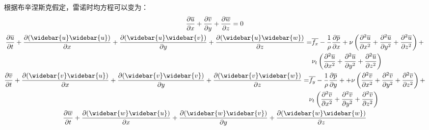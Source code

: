 根据布辛涅斯克假定，雷诺时均方程可以变为：
\begin{equation}
  \begin{gathered}
    \frac{\partial \overline{u}}{\partial x} +
    \frac{\partial \overline{v}}{\partial y} +
    \frac{\partial \overline{w}}{\partial z}
    =
    0
    \\
    \begin{aligned}
      \frac{\partial \overline{u}}{\partial t} +
      \frac{\partial (\widebar{u}\widebar{u})}{\partial x} +
      \frac{\partial (\widebar{u}\widebar{v})}{\partial y} +
      \frac{\partial (\widebar{u}\widebar{w})}{\partial z}
      = 
      &\overline{f_{x}} -
      \frac{1}{\rho}\frac{\partial \overline{p}}{\partial x}
      +
      \nu
      \left(
      \frac{\partial^{2} \overline{u}}{\partial x^{2}} +
      \frac{\partial^{2} \overline{u}}{\partial y^{2}} +
      \frac{\partial^{2} \overline{u}}{\partial z^{2}}
      \right)
      +
      \\
      &
      \nu_{t}
      \left(
      \frac{\partial^{2} \overline{u}}{\partial x^{2}} +
      \frac{\partial^{2} \overline{u}}{\partial y^{2}} +
      \frac{\partial^{2} \overline{u}}{\partial z^{2}}
      \right)
    \end{aligned}
    \\
    \begin{aligned}
      \frac{\partial \overline{v}}{\partial t} +
      \frac{\partial (\widebar{v}\widebar{u})}{\partial x} +
      \frac{\partial (\widebar{v}\widebar{v})}{\partial y} +
      \frac{\partial (\widebar{v}\widebar{w})}{\partial z}
      = 
      &\overline{f_{y}} -
      \frac{1}{\rho}\frac{\partial \overline{p}}{\partial y} +
      +
      \nu
      \left(
      \frac{\partial^{2} \overline{v}}{\partial x^{2}} +
      \frac{\partial^{2} \overline{v}}{\partial y^{2}} +
      \frac{\partial^{2} \overline{v}}{\partial z^{2}}
      \right)
      +
      \\
      &
      \nu_{t}
      \left(
      \frac{\partial^{2} \overline{v}}{\partial x^{2}} +
      \frac{\partial^{2} \overline{v}}{\partial y^{2}} +
      \frac{\partial^{2} \overline{v}}{\partial z^{2}}
      \right)
    \end{aligned}
    \\
    \begin{aligned}
      \frac{\partial \overline{w}}{\partial t} +
      \frac{\partial (\widebar{w}\widebar{u})}{\partial x} +
      \frac{\partial (\widebar{w}\widebar{v})}{\partial y} +
      \frac{\partial (\widebar{w}\widebar{w})}{\partial z}

\end{aligned}
\end{gathered}
\end{equation}
